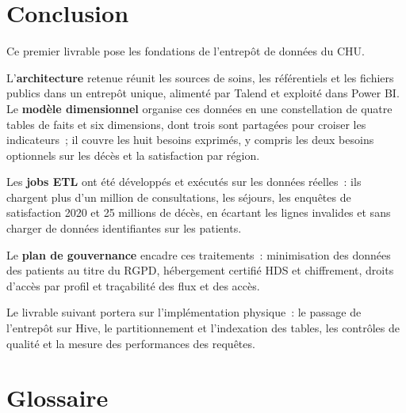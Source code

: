 \newpage
\section*{Conclusion}
{}

\noindent Ce premier livrable pose les fondations de l'entrepôt de données du CHU.

\vspace{0.2cm}

\noindent L'\textbf{architecture} retenue réunit les sources de soins, les référentiels et les fichiers publics dans un entrepôt unique, alimenté par Talend et exploité dans Power BI. Le \textbf{modèle dimensionnel} organise ces données en une constellation de quatre tables de faits et six dimensions, dont trois sont partagées pour croiser les indicateurs~; il couvre les huit besoins exprimés, y compris les deux besoins optionnels sur les décès et la satisfaction par région.

\vspace{0.2cm}

\noindent Les \textbf{jobs ETL} ont été développés et exécutés sur les données réelles~: ils chargent plus d'un million de consultations, les séjours, les enquêtes de satisfaction 2020 et 25 millions de décès, en écartant les lignes invalides et sans charger de données identifiantes sur les patients.

\vspace{0.2cm}

\noindent Le \textbf{plan de gouvernance} encadre ces traitements~: minimisation des données des patients au titre du RGPD, hébergement certifié HDS et chiffrement, droits d'accès par profil et traçabilité des flux et des accès.

\vspace{0.2cm}

\noindent Le livrable suivant portera sur l'implémentation physique~: le passage de l'entrepôt sur Hive, le partitionnement et l'indexation des tables, les contrôles de qualité et la mesure des performances des requêtes.

\newpage
\section*{Glossaire}
{}

